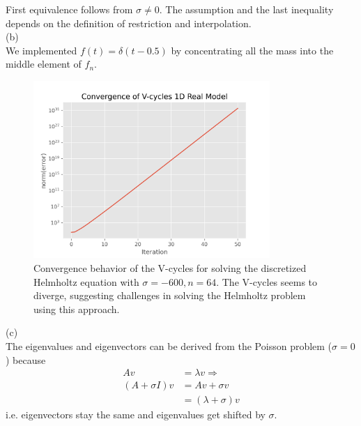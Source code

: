 \documentclass[a4paper,12pt]{article}
\begin{document}
First equivalence follows from $\sigma \neq 0$. The assumption and the last inequality depends on the definition of
restriction and interpolation. \\
(b) \\
We implemented $f(t) = \delta(t-0.5)$ by concentrating all the mass into the middle element of $f_n$.\\
\begin{figure}[h!]
    \centering
    \includegraphics[width=0.8\textwidth]{../code/plts/convergence_1Dreal.png}
    \caption{
        Convergence behavior of the V-cycles for solving
        the discretized Helmholtz equation with $\sigma = -600, n = 64$.
        The V-cycles seems to diverge,
        suggesting challenges in solving the Helmholtz problem using this approach.
    }

    \label{fig:1Dreal}
\end{figure}


(c) \\
The eigenvalues and eigenvectors can be derived from the Poisson problem ($\sigma=0$) because
\begin{align}
    Av            & = \lambda v \Rightarrow \\
    (A+\sigma I)v & = Av + \sigma v         \\
                  & = (\lambda+\sigma)v
\end{align}
i.e. eigenvectors stay the same and eigenvalues get shifted by $\sigma$. \\
\end{document}
